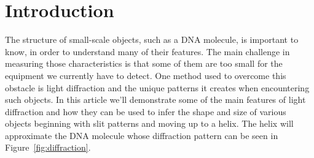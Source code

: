 \section{Introduction}\label{sec:introduction}
The structure of small-scale objects, such as a DNA molecule, is important to know, in order to understand many of their features.
The main challenge in measuring those characteristics is that some of them are too small for the equipment we currently have to detect.
One method used to overcome this obstacle is light diffraction and the unique patterns it creates when encountering such objects.
In this article we'll demonstrate some of the main features of light diffraction and how they can be used to infer the shape and size of various objects beginning with slit patterns and moving up to a helix.
The helix will approximate the DNA molecule whose diffraction pattern can be seen in Figure~\ref{fig:diffraction}.



